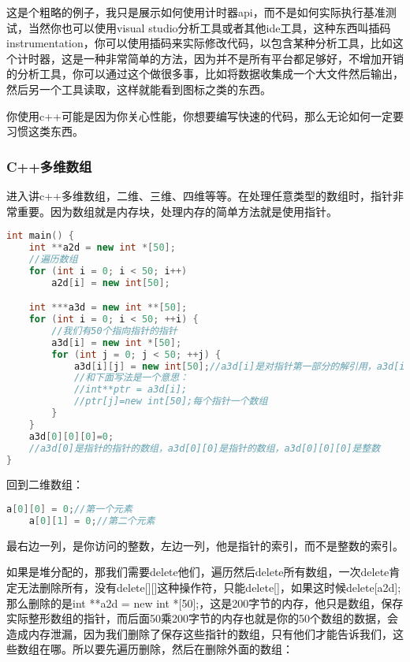 这是个粗略的例子，我只是展示如何使用计时器api，而不是如何实际执行基准测试，当然你也可以使用visual studio分析工具或者其他ide工具，这种东西叫插码{\ncodestyle instrumentation}，你可以使用插码来实际修改代码，以包含某种分析工具，比如这个计时器，这是一种非常简单的方法，因为并不是所有平台都足够好，不增加开销的分析工具，你可以通过这个做很多事，比如将数据收集成一个大文件然后输出，然后另一个工具读取，这样就能看到图标之类的东西。

你使用c++可能是因为你关心性能，你想要编写快速的代码，那么无论如何一定要习惯这类东西。



\subsubsection{C++多维数组}


进入讲c++多维数组，二维、三维、四维等等。在处理任意类型的数组时，指针非常重要。因为数组就是内存块，处理内存的简单方法就是使用指针。

\begin{lstlisting}[language=c++]
int main() {
    int **a2d = new int *[50];
    //遍历数组
    for (int i = 0; i < 50; i++)
        a2d[i] = new int[50];

    int ***a3d = new int **[50];
    for (int i = 0; i < 50; ++i) {
        //我们有50个指向指针的指针
        a3d[i] = new int *[50];
        for (int j = 0; j < 50; ++j) {
            a3d[i][j] = new int[50];//a3d[i]是对指针第一部分的解引用，a3d[i][j]是对第二部分进行解引用
            //和下面写法是一个意思：
            //int**ptr = a3d[i];
            //ptr[j]=new int[50];每个指针一个数组
        }
    }
    a3d[0][0][0]=0;
    //a3d[0]是指针的指针的数组，a3d[0][0]是指针的数组，a3d[0][0][0]是整数
}
\end{lstlisting}

回到二维数组：

\begin{lstlisting}[language=c++]
    a[0][0] = 0;//第一个元素
    a[0][1] = 0;//第二个元素
\end{lstlisting}
最右边一列，是你访问的整数，左边一列，他是指针的索引，而不是整数的索引。

如果是堆分配的，那我们需要{\ncodestyle delete}他们，遍历然后{\ncodestyle delete}所有数组，一次{\ncodestyle delete}肯定无法删除所有，没有{\ncodestyle delete[][]}这种操作符，只能{\ncodestyle delete[]}，如果这时候{\ncodestyle delete[a2d];}那么删除的是{\ncodestyle int **a2d = new int *[50];}，这是200字节的内存，他只是数组，保存实际整形数组的指针，而后面50乘200字节的内存也就是你的50个数组的数据，会造成内存泄漏，因为我们删除了保存这些指针的数组，只有他们才能告诉我们，这些数组在哪。所以要先遍历删除，然后在删除外面的数组：

